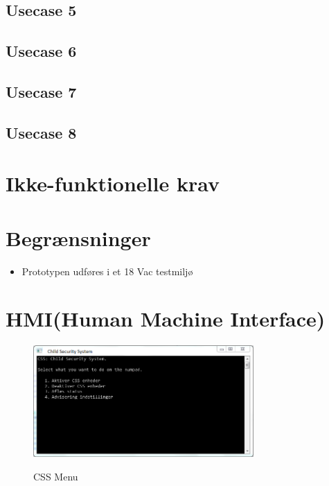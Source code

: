 \subsection{Usecase 5}


\subsection{Usecase 6}


\subsection{Usecase 7}



\subsection{Usecase 8}



\section{Ikke-funktionelle krav}



\section{Begrænsninger}
\begin{itemize}
\item Prototypen udføres i et 18 Vac testmiljø
\end{itemize}

\newpage
\section{HMI(Human Machine Interface)}

\begin{figure}[h] \centering
{\includegraphics[width=0.75\textwidth]{billeder/cmdprompt/CSS_menu}}
\caption{CSS Menu}
\end{figure}

